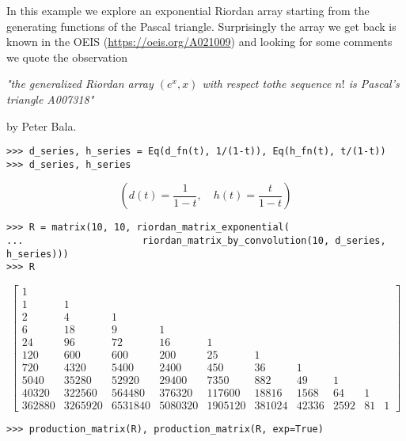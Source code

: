 \begin{example}
In this example we explore an exponential Riordan array starting from the
generating functions of the Pascal triangle. Surprisingly the array we get back
is known in the OEIS (\url{https://oeis.org/A021009}) and looking for some
comments we quote the observation\newline
\begin{center} 
\textit{"the generalized Riordan array $(e^x, x)$ with respect
to\newline the sequence $n!$ is Pascal's triangle A007318"} 
\end{center} 
by Peter Bala.
\begin{verbatim}
>>> d_series, h_series = Eq(d_fn(t), 1/(1-t)), Eq(h_fn(t), t/(1-t))
>>> d_series, h_series
\end{verbatim}
\begin{displaymath}
\left ( d{\left (t \right )} = \frac{1}{1-t}, \quad h{\left (t \right )} = \frac{t}{1-t}\right )
\end{displaymath}
\begin{verbatim}
>>> R = matrix(10, 10, riordan_matrix_exponential(
...                     riordan_matrix_by_convolution(10, d_series, h_series)))
>>> R
\end{verbatim}
\begin{displaymath}
\left[\begin{matrix}1 &   &   &   &   &   &   &   &   &  \\1 & 1 &   &   &   &   &   &   &   &  \\2 & 4 & 1 &   &   &   &   &   &   &  \\6 & 18 & 9 & 1 &   &   &   &   &   &  \\24 & 96 & 72 & 16 & 1 &   &   &   &   &  \\120 & 600 & 600 & 200 & 25 & 1 &   &   &   &  \\720 & 4320 & 5400 & 2400 & 450 & 36 & 1 &   &   &  \\5040 & 35280 & 52920 & 29400 & 7350 & 882 & 49 & 1 &   &  \\40320 & 322560 & 564480 & 376320 & 117600 & 18816 & 1568 & 64 & 1 &  \\362880 & 3265920 & 6531840 & 5080320 & 1905120 & 381024 & 42336 & 2592 & 81 & 1\end{matrix}\right]
\end{displaymath}
\begin{verbatim}
>>> production_matrix(R), production_matrix(R, exp=True)

\end{verbatim}
\end{example}

